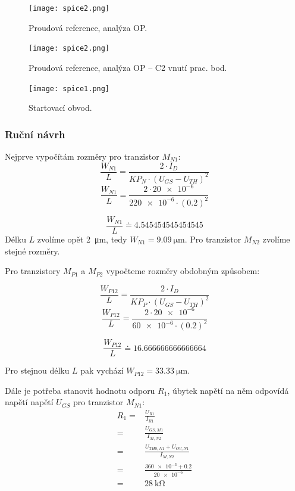   \begin{figure}[h!]
    \centering
    \texttt{[image: spice2.png]}
    \caption{Proudová reference, analýza OP.}
    \label{fig:spice0-png}
  \end{figure}

  \begin{figure}[h!]
    \centering
    \texttt{[image: spice2.png]}
    \caption{Proudová reference, analýza OP -- C2 vnutí prac. bod.}
    \label{fig:spice0-png}
  \end{figure}

  \begin{figure}[h!]
    \centering
    \texttt{[image: spice1.png]}
    \caption{Startovací obvod.}
    \label{fig:spice0-png}
  \end{figure}


\clearpage
\subsubsection{Ruční návrh}
Nejprve vypočítám rozměry pro tranzistor \(M_{N1} \):
\[
    \frac{W_{N1} }{L}=\frac{2\cdot I_{D}}{KP_{N}\cdot (U_{GS} -U_{TH})^2 } 
\]
\[
    \frac{W_{N1} }{L}=\frac{2\cdot \num{20e-6}}{\num{220e-6}\cdot (\num{0.2})^2 } 
\]

\[
    \frac{W_{N1} }{L}\doteq \num[round-mode=places,round-precision=2]{4.545454545454545} 
\]
Délku \(L\) zvolíme opět \qty{2}{\micro\meter}, tedy \(W_{N1}= \qty{9.09}{\micro\meter}\). Pro tranzistor \(M_{N2} \) zvolíme stejné rozměry.

Pro tranzistory \(M_{P1} \) a \(M_{P2} \) vypočteme rozměry obdobným způsobem:

\[
    \frac{W_{P12} }{L}=\frac{2\cdot I_{D}}{KP_{P}\cdot (U_{GS} -U_{TH})^2 } 
\]
\[
    \frac{W_{P12} }{L}=\frac{2\cdot \num{20e-6}}{\num{60e-6}\cdot (\num{0.2})^2 } 
\]

\[
    \frac{W_{P12} }{L}\doteq \num[round-mode=places,round-precision=2]{16.666666666666664}
\]

Pro stejnou délku \(L\) pak vychází \(W_{P12}=\qty{33.33}{\micro\meter} \).

Dále je potřeba stanovit hodnotu odporu \(R_{1} \), úbytek napětí na něm odpovídá napětí napětí \(U_{GS} \) pro tranzistor \(M_{N1} \):
\begin{align*}
    R_{1} =& \frac{U_{R1}}{I_{R1}} \\
          =& \frac{U_{GS,M1}}{I_{M,N2}} \\
          =& \frac{U_{TH0,N1}+U_{OV,N1} }{I_{M,N2}} \\
          =& \frac{\num{360e-3}+\num{0.2} }{\num{20e-6}} \\
          =& \qty{28}{\kilo\ohm}
\end{align*}

